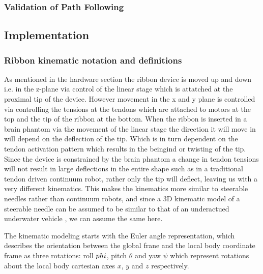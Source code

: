 \subsubsection{Validation of Path Following}


\subsection{Implementation}

\subsubsection{Ribbon kinematic notation and definitions}
As mentioned in the hardware section the ribbon device is moved up and down i.e. in the z-plane via control of the linear stage which is attatched at the proximal tip of the device. However movement in the x and y plane is controlled via controlling the tensions at the tendons which are attached to motors at the top and the tip of the ribbon at the bottom. When the ribbon is inserted in a brain phantom via the movement of the linear stage the direction it will move in will depend on the deflection of the tip. Which is in turn dependent on the tendon activation pattern which results in the beingind or twisting of the tip. Since the device is constrained by the brain phantom a change in tendon tensions will not result in large deflections in the entire shape such as in a traditional tendon driven continuum robot, rather only the tip will deflect, leaving us with a very different kinematics. This makes the kinematics more similar to steerable needles rather than continuum robots, and since a 3D kinematic model of a steerable needle can be assumed to be similar to that of an underactued underwater vehicle \cite{secoli_closed-loop_2013}, we can assume the same here.  


The kinematic modeling starts with the Euler angle representation, which describes the orientation between the global frane and the local body coordinate frame as three rotations: roll \(\\phi\), pitch \(\theta\) and yaw \(\psi\) which represent rotations about the local body cartesian axes \(x\), \(y\) and \(z\) respectively.


